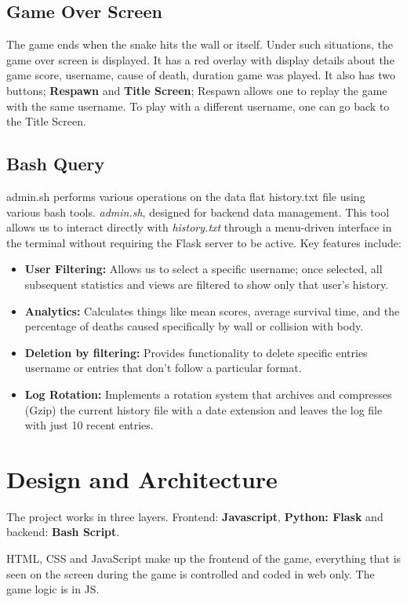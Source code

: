 \documentclass[12pt, letterpaper]{article}
\begin{document}
\subsection{Game Over Screen}
The game ends when the snake hits the wall or itself. Under such situations, the game over screen is displayed. It has a red overlay with display details about the game score, username, cause of death, duration game was played. It also has two buttons; \textbf{Respawn} and \textbf{Title Screen}; Respawn allows one to replay the game with the same username. To play with a different username, one can go back to the Title Screen.

\subsection{Bash Query}
 admin.sh performs various operations on the data flat history.txt file using various bash tools. \textit{admin.sh}, designed for backend data management. This tool allows us to interact directly with \textit{history.txt} through a menu-driven interface in the terminal without requiring the Flask server to be active. Key features include:
\begin{itemize}
    \item \textbf{User Filtering:} Allows us to select a specific username; once selected, all subsequent statistics and views are filtered to show only that user's history.
    \item \textbf{Analytics:} Calculates things like mean scores, average survival time, and the percentage of deaths caused specifically by wall or collision with body.
    \item \textbf{Deletion by filtering:} Provides functionality to delete specific entries username or entries that don't follow a particular format.
    \item \textbf{Log Rotation:} Implements a rotation system that archives and compresses (Gzip) the current history file with a date extension and leaves the log file with just 10 recent entries.
\end{itemize}

\section{Design and Architecture}
The project works in three layers. Frontend: \textbf{Javascript}, \textbf{Python: Flask} and backend: \textbf{Bash Script}.

HTML, CSS and JavaScript make up the frontend of the game, everything that is seen on the screen during the game is controlled and coded in web only. The game logic is in JS. 
\end{document}
